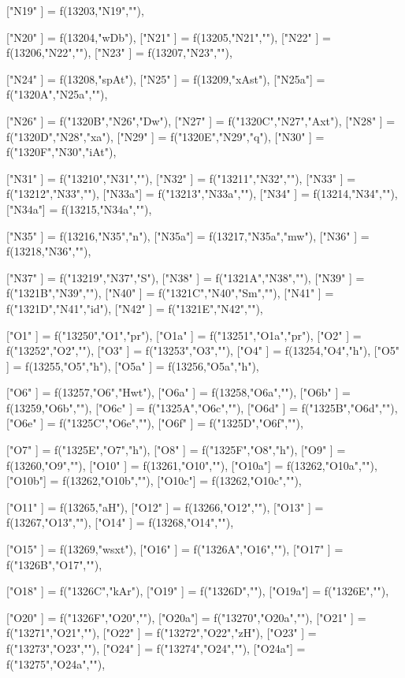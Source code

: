 {["N19" ] = f(13203,"N19",""),

["N20" ] = f(13204,"wDb"),
["N21" ] = f(13205,"N21",""),
["N22" ] = f(13206,"N22",""),
["N23" ] = f(13207,"N23",""),

["N24" ] = f(13208,"spAt"),
["N25" ] = f(13209,"xAst"),
["N25a"] = f("1320A","N25a",""),

["N26" ] = f("1320B","N26","Dw"),
["N27" ] = f("1320C","N27","Axt"),
["N28" ] = f("1320D","N28","xa"),
["N29" ] = f("1320E","N29","q"),
["N30" ] = f("1320F","N30","iAt"),

["N31" ] = f("13210","N31",""),
["N32" ] = f("13211","N32",""),
["N33" ] = f("13212","N33",""),
["N33a"] = f("13213","N33a",""),
["N34" ] = f(13214,"N34",""),
["N34a"] = f(13215,"N34a",""),

["N35" ] = f(13216,"N35","n"),
["N35a"] = f(13217,"N35a","mw"),
["N36" ] = f(13218,"N36",""),

["N37" ] = f("13219","N37","S"),
["N38" ] = f("1321A","N38",""),
["N39" ] = f("1321B","N39",""),
["N40" ] = f("1321C","N40","Sm",""),
["N41" ] = f("1321D","N41","id"),
["N42" ] = f("1321E","N42",""),

["O1"  ] = f("13250","O1","pr"),
["O1a" ] = f("13251","O1a","pr"),
["O2"  ] = f("13252","O2",""),
["O3"  ] = f("13253","O3",""),
["O4"  ] = f(13254,"O4","h"),
["O5"  ] = f(13255,"O5","h"),
["O5a" ] = f(13256,"O5a","h"),

["O6"  ] = f(13257,"O6","Hwt"),
["O6a" ] = f(13258,"O6a",""),
["O6b" ] = f(13259,"O6b",""),
["O6c" ] = f("1325A","O6c",""),
["O6d" ] = f("1325B","O6d",""),
["O6e" ] = f("1325C","O6e",""),
["O6f" ] = f("1325D","O6f",""),

["O7"  ] = f("1325E","O7","h"),
["O8"  ] = f("1325F","O8","h"),
["O9"  ] = f(13260,"O9",""),
["O10" ] = f(13261,"O10",""),
["O10a"] = f(13262,"O10a",""),
["O10b"] = f(13262,"O10b",""),
["O10c"] = f(13262,"O10c",""),

["O11" ] = f(13265,"aH"),
["O12" ] = f(13266,"O12",""),
["O13" ] = f(13267,"O13",""),
["O14" ] = f(13268,"O14",""),

["O15" ] = f(13269,"wsxt"),
["O16" ] = f("1326A","O16",""),
["O17" ] = f("1326B","O17",""),

["O18" ] = f("1326C","kAr"),
["O19" ] = f("1326D",""),
["O19a"] = f("1326E",""),

["O20" ] = f("1326F","O20",""),
["O20a"] = f("13270","O20a",""),
["O21" ] = f("13271","O21",""),
["O22" ] = f("13272","O22","zH"),
["O23" ] = f("13273","O23",""),
["O24" ] = f("13274","O24",""),
["O24a"] = f("13275","O24a",""),

}
